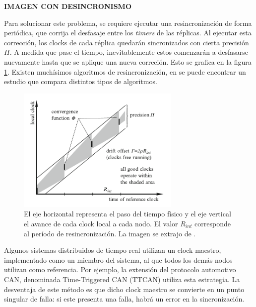 {\Large \textbf{{\color{red} IMAGEN CON DESINCRONISMO}}}

Para solucionar este problema, se requiere ejecutar una resincronización de forma periódica, que corrija el desfasaje entre los \textit{timers} de las réplicas. Al ejecutar esta corrección, los clocks de cada réplica quedarán sincronizados con cierta precisión $\Pi$. A medida que pase el tiempo, inevitablemente estos comenzarán a desfasarse nuevamente hasta que se aplique una nueva correción. Esto se grafica en la figura \ref{fig:TTA_resincronizacion}. Existen muchísimos algoritmos de resincronización, en \cite{anceaume1998performance} se puede encontrar un estudio que compara distintos tipos de algoritmos.

\begin{figure}[H]
    \centering
    \includegraphics[width=0.7\textwidth]{img/TTA_resincronizacion.png}
    \caption{El eje horizontal representa el paso del tiempo físico y el eje vertical el avance de cada clock local a cada nodo. El valor $R_{int}$ corresponde al período de resincronización. La imagen se extrajo de \cite[p.~67]{kopetz-2011}.}
    \label{fig:TTA_resincronizacion}    
\end{figure}


Algunos sistemas distribuidos de tiempo real utilizan un clock maestro, implementado como un miembro del sistema, al que todos los demás nodos utilizan como referencia. Por ejemplo, la extensión del protocolo automotivo CAN, denominada Time-Triggered CAN (TTCAN) \cite{leen2002ttcan} utiliza esta estrategia. La desventaja de este método es que dicho clock maestro se convierte en un punto singular de falla: si este presenta una falla, habrá un error en la sincronización. 

